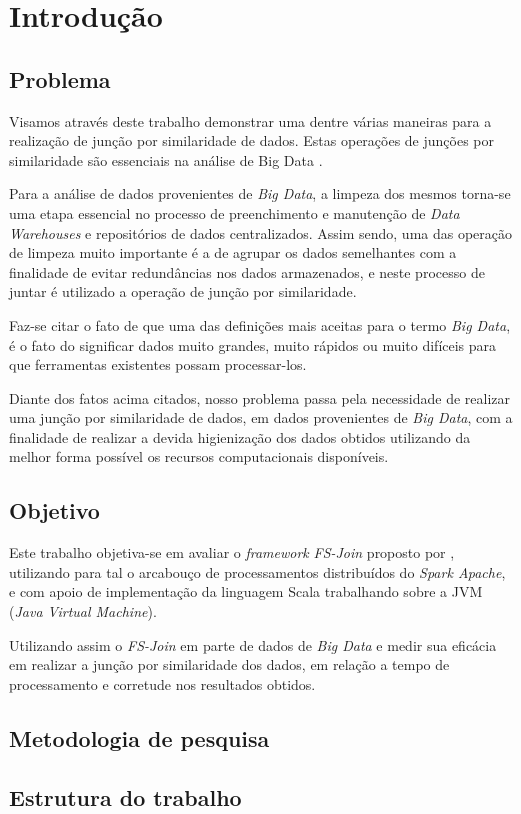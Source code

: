 \chapter{Introdução}
\label{cap:intro}
\section{Problema}

Visamos através deste trabalho demonstrar uma dentre várias maneiras para a realização de junção por similaridade de dados. Estas operações de junções por similaridade são essenciais na análise de Big Data \cite{Rong:2017:FS-Join}.

Para a análise de dados provenientes de \textit{Big Data}, a limpeza dos mesmos torna-se uma etapa essencial no processo de preenchimento e manutenção de \textit{Data Warehouses} e repositórios de dados centralizados. Assim sendo, uma das operação de limpeza muito importante é a de agrupar os dados semelhantes com a finalidade de evitar redundâncias nos dados armazenados, e neste processo de juntar é utilizado a operação de junção por similaridade\cite{Chaudhuri:2006:POS:1129754.1129865}.

Faz-se citar o fato de que uma das definições mais aceitas para o termo \textit{Big Data}, é o fato do significar dados muito grandes, muito rápidos ou muito difíceis para que ferramentas existentes possam processar-los\cite{Madden:2012}.

Diante dos fatos acima citados, nosso problema passa pela necessidade de realizar uma junção por similaridade de dados, em dados provenientes de \textit{Big Data}, com a finalidade de realizar a devida higienização dos dados obtidos utilizando da melhor forma possível os recursos computacionais disponíveis.

\section{Objetivo}

Este trabalho objetiva-se em avaliar o \textit{framework} \textit{FS-Join} proposto por \cite{Rong:2017:FS-Join}, utilizando para tal o arcabouço de processamentos distribuídos do \textit{Spark Apache}, e com apoio de implementação da linguagem Scala trabalhando sobre a JVM (\textit{Java Virtual Machine}). 

Utilizando assim o \textit{FS-Join} em parte de dados de \textit{Big Data} e medir sua eficácia em realizar a junção por similaridade dos dados, em relação a tempo de processamento e corretude nos resultados obtidos.

\section{Metodologia de pesquisa}

\section{Estrutura do trabalho}

